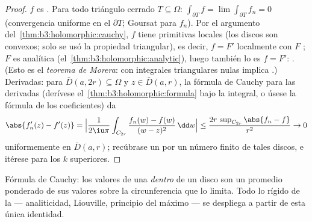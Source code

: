 \begin{proof}
$f$ es . Para todo
triángulo cerrado $T \subseteq
\Omega$: $\int_{\partial T}f = \lim\int_{\partial T}f_n = 0$
(convergencia uniforme en el 
$\partial T$; Goursat para $f_n$). Por el argumento
del~\cref{thm:b3:holomorphic:cauchy}, $f$ tiene primitivas locales (los
discos son convexos; solo se usó la propiedad triangular), es decir,
$f = F'$ localmente con $F$ ;
$F$ es analítica (el~\cref{thm:b3:holomorphic:analytic}), luego también
lo es $f = F'$: . (Esto es el
\emph{teorema de Morera}:
 con integrales
triangulares nulas implica .)
Derivadas: para $\bar D(a, 2r) \subseteq \Omega$ y $z \in \bar D(a, r)$,
la fórmula de Cauchy para las derivadas (derívese
el~\cref{thm:b3:holomorphic:formula} bajo la integral, o úsese la
fórmula de los coeficientes) da
\[
\abs{f_n'(z) - f'(z)} =
\Bigl|\frac{1}{2\iu\pi}\int_{C_{2r}}\frac{f_n(w) - f(w)}{(w -
z)^2}\,\dd w\Bigr|
\leq \frac{2r\,\sup_{C_{2r}}\abs{f_n - f}}{r^2} \to 0
\]
uniformemente en $\bar D(a,r)$; recúbrase un
 por un número finito de tales
discos, e itérese para los $k$ superiores.
\end{proof}

\begin{omfigure}

{\small Fórmula de Cauchy: los valores de una
 \emph{dentro} de un
disco son un promedio ponderado de sus valores sobre la circunferencia
que lo limita. Todo lo rígido de la
 --- analiticidad,
Liouville, principio del máximo --- se despliega a partir de esta única
identidad.}
\end{omfigure}

